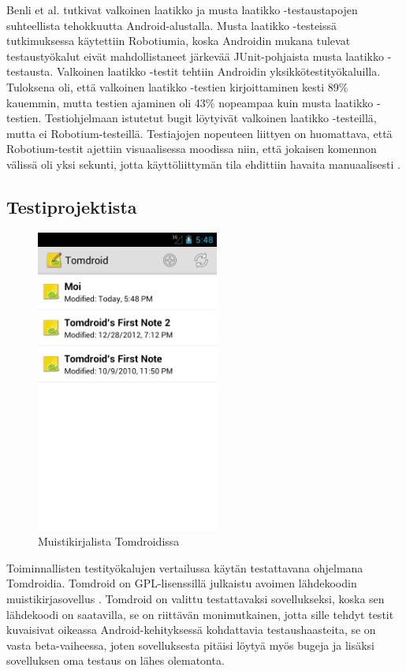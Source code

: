 Benli et al. tutkivat valkoinen laatikko ja musta laatikko -testaustapojen suhteellista tehokkuutta Android-alustalla. Musta laatikko -testeissä tutkimuksessa käytettiin Robotiumia, koska Androidin mukana tulevat testaustyökalut eivät mahdollistaneet järkevää JUnit-pohjaista musta laatikko -testausta. Valkoinen laatikko -testit tehtiin Androidin yksikkötestityökaluilla. Tuloksena oli, että valkoinen laatikko -testien kirjoittaminen kesti 89\% kauemmin, mutta testien ajaminen oli 43\% nopeampaa kuin musta laatikko -testien. Testiohjelmaan istutetut bugit löytyivät valkoinen laatikko -testeillä, mutta ei Robotium-testeillä. Testiajojen nopeuteen liittyen on huomattava, että Robotium-testit ajettiin visuaalisessa moodissa niin, että jokaisen komennon välissä oli yksi sekunti, jotta käyttöliittymän tila ehdittiin havaita manuaalisesti \cite{benli12}.

\subsection{Testiprojektista}
\label{tomdroid}

\begin{figure}[htb]
\includegraphics[width=60mm]{tomdroid_notelist.png}
\caption{Muistikirjalista Tomdroidissa} \label{tomdroid_notelist}
\end{figure}

Toiminnallisten testityökalujen vertailussa käytän testattavana ohjelmana Tomdroidia. Tomdroid on GPL-lisenssillä julkaistu avoimen lähdekoodin muistikirjasovellus \cite{tomdroid}. Tomdroid on valittu testattavaksi sovellukseksi, koska sen lähdekoodi on saatavilla, se on riittävän monimutkainen, jotta sille tehdyt testit kuvaisivat oikeassa Android-kehityksessä kohdattavia testaushaasteita, se on vasta beta-vaiheessa, joten sovelluksesta pitäisi löytyä myös bugeja ja lisäksi sovelluksen oma testaus on lähes olematonta.

